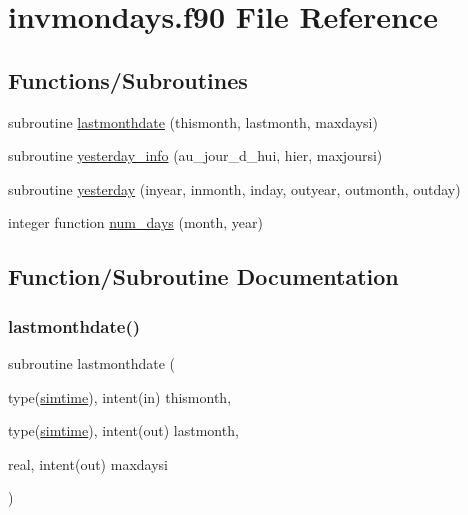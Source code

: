\hypertarget{invmondays_8f90}{}\section{invmondays.\+f90 File Reference}
\label{invmondays_8f90}
\subsection*{Functions/\+Subroutines}
\begin{DoxyCompactItemize}
\item 
subroutine \hyperlink{invmondays_8f90_a6d8d52f8e0c5ef504c1a38a72cda5b01}{lastmonthdate} (thismonth, lastmonth, maxdaysi)
\item 
subroutine \hyperlink{invmondays_8f90_ab24cf4964d266158f880214060f2ce53}{yesterday\+\_\+info} (au\+\_\+jour\+\_\+d\+\_\+hui, hier, maxjoursi)
\item 
subroutine \hyperlink{invmondays_8f90_a793b0c319548b2101ffe071aabc0f2f2}{yesterday} (inyear, inmonth, inday, outyear, outmonth, outday)
\item 
integer function \hyperlink{invmondays_8f90_ac5102abe4057964dceefd23fb743bc67}{num\+\_\+days} (month, year)
\end{DoxyCompactItemize}


\subsection{Function/\+Subroutine Documentation}
\mbox{\label{invmondays_8f90_a6d8d52f8e0c5ef504c1a38a72cda5b01}} 
\subsubsection{\texorpdfstring{lastmonthdate()}{lastmonthdate()}}
{\footnotesize\ttfamily subroutine lastmonthdate (\begin{DoxyParamCaption}\item[{type(\hyperlink{structed__misc__coms_1_1simtime}{simtime}), intent(in)}]{thismonth,  }\item[{type(\hyperlink{structed__misc__coms_1_1simtime}{simtime}), intent(out)}]{lastmonth,  }\item[{real, intent(out)}]{maxdaysi }\end{DoxyParamCaption})}

